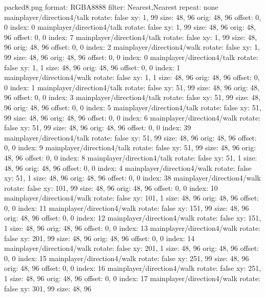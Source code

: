 packed8.png
format: RGBA8888
filter: Nearest,Nearest
repeat: none
mainplayer/direction4/talk
  rotate: false
  xy: 1, 99
  size: 48, 96
  orig: 48, 96
  offset: 0, 0
  index: 0
mainplayer/direction4/talk
  rotate: false
  xy: 1, 99
  size: 48, 96
  orig: 48, 96
  offset: 0, 0
  index: 7
mainplayer/direction4/talk
  rotate: false
  xy: 1, 99
  size: 48, 96
  orig: 48, 96
  offset: 0, 0
  index: 2
mainplayer/direction4/walk
  rotate: false
  xy: 1, 99
  size: 48, 96
  orig: 48, 96
  offset: 0, 0
  index: 0
mainplayer/direction4/talk
  rotate: false
  xy: 1, 1
  size: 48, 96
  orig: 48, 96
  offset: 0, 0
  index: 1
mainplayer/direction4/walk
  rotate: false
  xy: 1, 1
  size: 48, 96
  orig: 48, 96
  offset: 0, 0
  index: 1
mainplayer/direction4/talk
  rotate: false
  xy: 51, 99
  size: 48, 96
  orig: 48, 96
  offset: 0, 0
  index: 3
mainplayer/direction4/talk
  rotate: false
  xy: 51, 99
  size: 48, 96
  orig: 48, 96
  offset: 0, 0
  index: 5
mainplayer/direction4/talk
  rotate: false
  xy: 51, 99
  size: 48, 96
  orig: 48, 96
  offset: 0, 0
  index: 6
mainplayer/direction4/walk
  rotate: false
  xy: 51, 99
  size: 48, 96
  orig: 48, 96
  offset: 0, 0
  index: 39
mainplayer/direction4/talk
  rotate: false
  xy: 51, 99
  size: 48, 96
  orig: 48, 96
  offset: 0, 0
  index: 9
mainplayer/direction4/talk
  rotate: false
  xy: 51, 99
  size: 48, 96
  orig: 48, 96
  offset: 0, 0
  index: 8
mainplayer/direction4/talk
  rotate: false
  xy: 51, 1
  size: 48, 96
  orig: 48, 96
  offset: 0, 0
  index: 4
mainplayer/direction4/walk
  rotate: false
  xy: 51, 1
  size: 48, 96
  orig: 48, 96
  offset: 0, 0
  index: 38
mainplayer/direction4/walk
  rotate: false
  xy: 101, 99
  size: 48, 96
  orig: 48, 96
  offset: 0, 0
  index: 10
mainplayer/direction4/walk
  rotate: false
  xy: 101, 1
  size: 48, 96
  orig: 48, 96
  offset: 0, 0
  index: 11
mainplayer/direction4/walk
  rotate: false
  xy: 151, 99
  size: 48, 96
  orig: 48, 96
  offset: 0, 0
  index: 12
mainplayer/direction4/walk
  rotate: false
  xy: 151, 1
  size: 48, 96
  orig: 48, 96
  offset: 0, 0
  index: 13
mainplayer/direction4/walk
  rotate: false
  xy: 201, 99
  size: 48, 96
  orig: 48, 96
  offset: 0, 0
  index: 14
mainplayer/direction4/walk
  rotate: false
  xy: 201, 1
  size: 48, 96
  orig: 48, 96
  offset: 0, 0
  index: 15
mainplayer/direction4/walk
  rotate: false
  xy: 251, 99
  size: 48, 96
  orig: 48, 96
  offset: 0, 0
  index: 16
mainplayer/direction4/walk
  rotate: false
  xy: 251, 1
  size: 48, 96
  orig: 48, 96
  offset: 0, 0
  index: 17
mainplayer/direction4/walk
  rotate: false
  xy: 301, 99
  size: 48, 96

